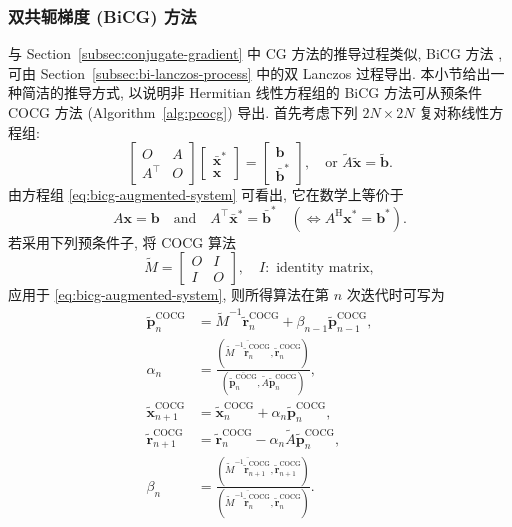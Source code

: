 \subsubsection{{双共轭梯度 (BiCG) 方法}}\label{subsec:bicg-method}
{与 Section\ \ref{subsec:conjugate-gradient} 中 CG 方法的推导过程类似, BiCG 方法 ,  可由 Section\ \ref{subsec:bi-lanczos-process} 中的双 Lanczos 过程导出.}
{本小节给出一种简洁的推导方式, 以说明非 Hermitian 线性方程组的 BiCG 方法可从预条件 COCG 方法 (Algorithm\ \ref{alg:pcocg}) 导出. 首先考虑下列 $2N\times2N$ 复对称线性方程组:}
\begin{equation}\label{eq:bicg-augmented-system}
\begin{bmatrix}O&A\\A^{\top}&O\end{bmatrix}\begin{bmatrix}\bar{\bm x}^{*}\\\bm x\end{bmatrix}=\begin{bmatrix}\bm b\\\bar{\bm b}^{*}\end{bmatrix},\quad\text{or }\widetilde A\widetilde{\bm x}=\widetilde{\bm b}.
\end{equation}
{由方程组 \eqref{eq:bicg-augmented-system} 可看出, 它在数学上等价于}
\[A\bm x=\bm b\quad\text{and}\quad A^{\top}\bar{\bm x}^{*}=\bar{\bm b}^{*}\quad(\Leftrightarrow A^{\mathrm H}\bm x^{*}=\bm b^{*}).\]
{若采用下列预条件子, 将 COCG 算法}
\begin{equation}\label{eq:bicg-swap-preconditioner}\widetilde M=\begin{bmatrix}O&I\\I&O\end{bmatrix},\quad I:\text{ identity matrix},\end{equation}
{应用于 \eqref{eq:bicg-augmented-system}, 则所得算法在第 $n$ 次迭代时可写为}
\[\begin{aligned}
\widetilde{\bm p}_n^{\mathrm{COCG}}&=\widetilde M^{-1}\widetilde{\bm r}_n^{\mathrm{COCG}}+\beta_{n-1}\widetilde{\bm p}_{n-1}^{\mathrm{COCG}},\\
\alpha_n&=\frac{(\overline{\widetilde M^{-1}\widetilde{\bm r}_n^{\mathrm{COCG}}},\widetilde{\bm r}_n^{\mathrm{COCG}})}{(\overline{\widetilde{\bm p}_n^{\mathrm{COCG}}},\widetilde A\widetilde{\bm p}_n^{\mathrm{COCG}})},\\
\widetilde{\bm x}_{n+1}^{\mathrm{COCG}}&=\widetilde{\bm x}_n^{\mathrm{COCG}}+\alpha_n\widetilde{\bm p}_n^{\mathrm{COCG}},\\
\widetilde{\bm r}_{n+1}^{\mathrm{COCG}}&=\widetilde{\bm r}_n^{\mathrm{COCG}}-\alpha_n\widetilde A\widetilde{\bm p}_n^{\mathrm{COCG}},\\
\beta_n&=\frac{(\overline{\widetilde M^{-1}\widetilde{\bm r}_{n+1}^{\mathrm{COCG}}},\widetilde{\bm r}_{n+1}^{\mathrm{COCG}})}{(\overline{\widetilde M^{-1}\widetilde{\bm r}_n^{\mathrm{COCG}}},\widetilde{\bm r}_n^{\mathrm{COCG}})}.
\end{aligned}\]
